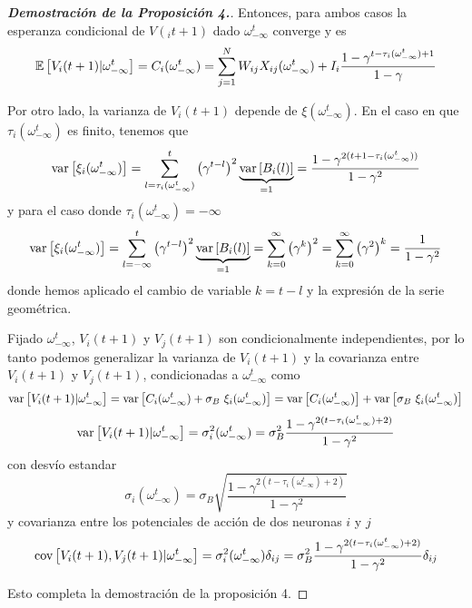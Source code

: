 \begin{proof}[\bf{Demostración de la Proposición 4.}]
Entonces, para ambos casos la esperanza condicional de $V(_it+1)$ dado $\omega_{-\infty}^t$ converge y es
\begin{equation}
    \mathbb{E} \left[V_i(t+1) | \omega_{-\infty}^t\right] = C_i(\omega_{-\infty}^t) =
    \sum_{j=1}^N W_{ij} X_{ij}(\omega_{-\infty}^t) + I_i \frac{1-\gamma^{t-\tau_i(\omega_{-\infty}^t)+1}}{1-\gamma}
\end{equation}

Por otro lado, la varianza de $V_i(t+1)$ depende de $\xi(\omega_{-\infty}^t)$. En el caso en que $\tau_i(\omega_{-\infty}^t)$ es finito, tenemos que
\begin{equation*}
    \text{var}\left[\xi_i(\omega_{-\infty}^t)\right] = \sum_{l=\tau_i(\omega_{-\infty}^t)}^t \left(\gamma^{t-l}\right)^2 \underbrace{\text{var}\left[B_i(l)\right]}_{=1} = \frac{1-\gamma^{2(t+1-\tau_i(\omega_{-\infty}^t))}}{1-\gamma^2}
\end{equation*}
y para el caso donde $\tau_i(\omega_{-\infty}^t) = -\infty$ 
\begin{equation*}
    \text{var}\left[\xi_i(\omega_{-\infty}^t)\right] = \sum_{l=-\infty}^t \left(\gamma^{t-l}\right)^2 \underbrace{\text{var}\left[B_i(l)\right]}_{=1} = \sum_{k=0}^\infty \left(\gamma^k\right)^2 = \sum_{k=0}^\infty \left(\gamma^2\right)^k =\frac{1}{1-\gamma^2}
\end{equation*}
donde hemos aplicado el cambio de variable $k=t-l$ y la expresión de la serie geométrica.

Fijado $\omega_{-\infty}^t$, $V_i(t+1)$ y $V_j(t+1)$ son condicionalmente independientes, por lo tanto podemos generalizar la varianza de $V_i(t+1)$ y la covarianza entre $V_i(t+1)$ y $V_j(t+1)$, condicionadas a $\omega_{-\infty}^t$ como
\begin{equation}
    \text{var}\left[V_i(t+1) | \omega_{-\infty}^t\right] = \text{var}\left[C_i(\omega_{-\infty}^t) + \sigma_B \  \xi_i(\omega_{-\infty}^t)\right] = \text{var}\left[C_i(\omega_{-\infty}^t)\right] + \text{var}\left[ \sigma_B \  \xi_i(\omega_{-\infty}^t)\right] 
\end{equation}
\begin{equation}
    \text{var}\left[V_i(t+1) | \omega_{-\infty}^t\right] = \sigma_i^2(\omega_{-\infty}^t) = \sigma_B^2 \frac{1-\gamma^{2(t-\tau_i(\omega_{-\infty}^t)+2)}}{1-\gamma^2}
    \label{eqn:sigma2}
\end{equation}
con desvío estandar
\begin{equation}
    \sigma_i(\omega_{-\infty}^t) = \sigma_B \sqrt{\frac{1-\gamma^{2(t-\tau_i(\omega_{-\infty}^t)+2)}}{1-\gamma^2}}
    \label{eqn:sigmai}
\end{equation}
y covarianza entre los potenciales de acción de dos neuronas $i$ y $j$
\begin{equation}
    \text{cov}\left[V_i(t+1),V_j(t+1) | \omega_{-\infty}^t\right] = \sigma_i^2(\omega_{-\infty}^t) \delta_{ij} = \sigma_B^2 \frac{1-\gamma^{2(t-\tau_i(\omega_{-\infty}^t)+2)}}{1-\gamma^2} \delta_{ij}
\end{equation}

Esto completa la demostración de la proposición 4.

\end{proof}

